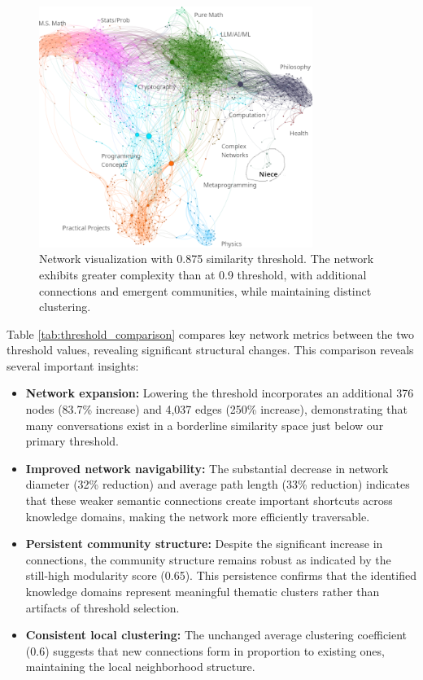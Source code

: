 \documentclass[10pt, a4paper]{article}
\begin{document}
\begin{figure}
\centering
\includegraphics[width=3.5in]{./images/0.875-wild-better.png}
\caption{Network visualization with 0.875 similarity threshold. The network exhibits greater complexity than at 0.9 threshold, with additional connections and emergent communities, while maintaining distinct clustering.}
\label{fig:threshold_comparison}
\end{figure}

Table \ref{tab:threshold_comparison} compares key network metrics between the two threshold values, revealing significant structural changes. This comparison reveals several important insights:

\begin{itemize}
    \item \textbf{Network expansion:} Lowering the threshold incorporates an additional 376 nodes (83.7\% increase) and 4,037 edges (250\% increase), demonstrating that many conversations exist in a borderline similarity space just below our primary threshold.
    
    \item \textbf{Improved network navigability:} The substantial decrease in network diameter (32\% reduction) and average path length (33\% reduction) indicates that these weaker semantic connections create important shortcuts across knowledge domains, making the network more efficiently traversable.
    
    \item \textbf{Persistent community structure:} Despite the significant increase in connections, the community structure remains robust as indicated by the still-high modularity score (0.65). This persistence confirms that the identified knowledge domains represent meaningful thematic clusters rather than artifacts of threshold selection.
    
    \item \textbf{Consistent local clustering:} The unchanged average clustering coefficient (0.6) suggests that new connections form in proportion to existing ones, maintaining the local neighborhood structure.
\end{itemize}
\end{document}
